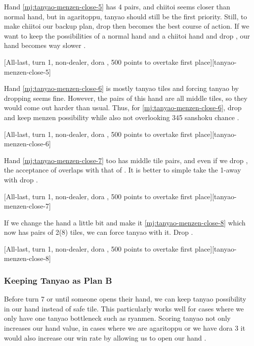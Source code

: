 \documentclass[12pt]{article}
\begin{document}
Hand \ref{mj:tanyao-menzen-close-5} has 4 pairs, and chiitoi seems closer than normal hand, but in agaritoppu, tanyao should still be the first priority. Still, to make chiitoi our backup plan,  drop then becomes the best course of action. If we want to keep the possibilities of a normal hand and a chiitoi hand and drop , our hand becomes way slower \citep[][pp.~57--58]{kawamura-naki}.

[All-last, turn 1, non-dealer, dora , 500 points to overtake first place][tanyao-menzen-close-5]

Hand \ref{mj:tanyao-menzen-close-6} is mostly tanyao tiles and forcing tanyao by dropping  seems fine. However, the pairs of this hand are all middle tiles, so they would come out harder than usual. Thus, for \ref{mj:tanyao-menzen-close-6}, drop  and keep menzen possibility while also not overlooking 345 sanshoku chance \citep[][pp.~59--60]{kawamura-naki}.

[All-last, turn 1, non-dealer, dora , 500 points to overtake first place][tanyao-menzen-close-6]

Hand \ref{mj:tanyao-menzen-close-7} too has middle tile pairs, and even if we drop , the acceptance of  overlaps with that of . It is better to simple take the 1-away with  drop \citep[][pp.~59--60]{kawamura-naki}.

[All-last, turn 1, non-dealer, dora , 500 points to overtake first place][tanyao-menzen-close-7]

If we change the hand a little bit and make it \ref{mj:tanyao-menzen-close-8} which now has pairs of 2(8) tiles, we can force tanyao with it. Drop  \citep[][pp.~59--60]{kawamura-naki}.

[All-last, turn 1, non-dealer, dora , 500 points to overtake first place][tanyao-menzen-close-8]


\subsubsection*{Keeping Tanyao as Plan B}

Before turn 7 or until someone opens their hand, we can keep tanyao possibility in our hand instead of safe tile. This particularly works well for cases where we only have one tanyao bottleneck such as  ryanmen. Scoring tanyao not only increases our hand value, in cases where we are agaritoppu or we have dora 3 it would also increase our win rate by allowing us to open our hand \citep[][pp.~155--158]{kawamura-naki}.
\end{document}
